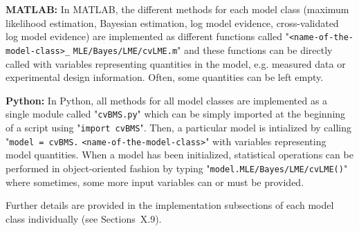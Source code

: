 \textbf{MATLAB:} In MATLAB, the different methods for each model class (maximum likelihood estimation, Bayesian estimation, log model evidence, cross-validated log model evidence) are implemented as different functions called "\verb|<name-of-the-model-class>_| \verb|MLE/Bayes/LME/cvLME.m|" and these functions can be directly called with variables representing quantities in the model, e.g. measured data or experimental design information. Often, some quantities can be left empty.

\textbf{Python:} In Python, all methods for all model classes are implemented as a single module called "\verb|cvBMS.py|" which can be simply imported at the beginning of a script using "\verb|import cvBMS|". Then, a particular model is intialized by calling "\verb|model = cvBMS.| \verb|<name-of-the-model-class>|" with variables representing model quantities. When a model has been initialized, statistical operations can be performed in object-oriented fashion by typing "\verb|model.MLE/Bayes/LME/cvLME()|" where sometimes, some more input variables can or must be provided.

Further details are provided in the implementation subsections of each model class individually (see Sections~X.9).